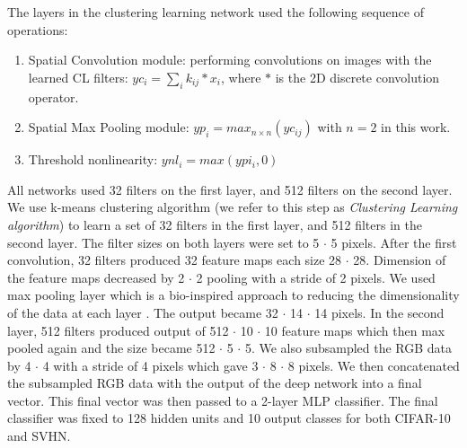 \documentclass{article} %
\begin{document}
The layers in the clustering learning network used the following sequence of operations:
\begin{enumerate}
\item Spatial Convolution module: performing convolutions on images with the learned CL filters: $yc_i=\sum_i{k_{ij}\ast x_i}$,
where $\ast$ is the 2D discrete convolution operator.
\item Spatial Max Pooling module: $yp_i = max_{n \times n}(yc_{ij})$ with $n =  2$ in this work.
\item Threshold nonlinearity: $ynl_i = max(ypi_i, 0)$
\end{enumerate}

All networks used 32 filters on the first layer, and 512 filters on the second layer.
We use k-means clustering algorithm (we refer to this step as \textit{Clustering Learning algorithm})
to learn a set of 32 filters in the first layer, and 512 filters in the second layer.
The filter sizes on both layers were set to 5 $\cdot$ 5 pixels.
After the first convolution, 32 filters produced 32 feature maps each size 28 $\cdot$ 28.
Dimension of the feature maps decreased by 2 $\cdot$ 2 pooling with a stride of 2 pixels.
We used max pooling layer which is a bio-inspired approach to reducing the dimensionality of the data at each layer \cite{lampl2004intracellular}.
The output became 32 $\cdot$ 14 $\cdot$ 14 pixels.
In the second layer, 512 filters produced output of 512 $\cdot$ 10 $\cdot$ 10 feature maps which then max pooled again and the size became 512 $\cdot$ 5 $\cdot$ 5. 
We also subsampled the RGB data by 4 $\cdot$ 4 with a stride of 4 pixels which gave 3 $\cdot$ 8 $\cdot$ 8 pixels.
We then concatenated the subsampled RGB data with the output of the deep network into a final vector.
This final vector was then passed to a 2-layer MLP classifier.
The final classifier was fixed to 128 hidden units and 10 output classes for both CIFAR-10 and SVHN.



\end{document}
